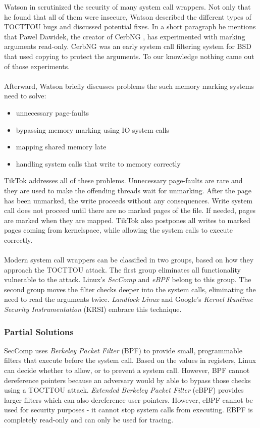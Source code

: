 Watson in \cite{watson2007exploiting} scrutinized the security of many system call wrappers. Not only that he found that all of them were insecure, Watson described the different
types of TOCTTOU bugs and discussed potential fixes.
In a short paragraph he mentions that Pawel Dawidek, the creator of CerbNG \cite{zak_frasunek_dawidek}, has experimented with marking arguments read-only. CerbNG was an early 
system call filtering system for BSD that used copying to protect the arguments. To our knowledge nothing came out of those experiments. 
\\
\\
Afterward, Watson briefly discusses problems the such memory marking systems need to solve: 
\begin{itemize}
    \item unnecessary page-faults
    \item bypassing memory marking using IO system calls
    \item mapping shared memory late
    \item handling system calls that write to memory correctly
\end{itemize}

TikTok addresses all of these problems. Unnecessary page-faults are rare and they are used to make the offending threads wait for unmarking. After the page has been unmarked,
the write proceeds without any consequences. Write system call does not proceed until there are no marked pages of the file. If needed, pages are marked when they are mapped. 
TikTok also postpones all writes to marked pages coming from kernelspace, while allowing the system calls to execute correctly.
\\
\\
Modern system call wrappers can be classified in two groups, based on how they approach the TOCTTOU attack. The first group eliminates all functionality vulnerable to the attack.
Linux's \emph{SecComp}\cite{seccomp} and \emph{eBPF}\cite{ebpf} belong to this group. The second group moves the filter checks deeper into the system calls, eliminating the need to read the arguments
twice. \emph{Landlock Linux}\cite{landlock} and Google's \emph{Kernel Runtime Security Instrumentation} (KRSI)\cite{krsi} embrace this technique.

\subsubsection{Partial Solutions}
SecComp\cite{seccomp} uses \emph{Berkeley Packet Filter} (BPF) to provide small, programmable filters that execute before the system call. Based on the values in registers, Linux can decide whether
to allow, or to prevent a system call. However, BPF cannot dereference pointers because an adversary would by able to bypass those checks using a TOCTTOU attack. 
\emph{Extended Berkeley Packet Filter} (eBPF)\cite{ebpf} provides larger filters which can also dereference user pointers. However, eBPF cannot be used for security purposes - it cannot stop
system calls from executing. EBPF is completely read-only and can only be used for tracing.
\\
\\
